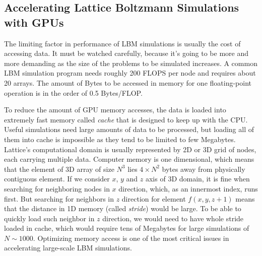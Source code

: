 %
%

\subsection{Accelerating Lattice Boltzmann Simulations with GPUs}

The limiting factor in performance of LBM simulations is usually the cost of accessing data. It must be watched carefully, because it's going to be more and more demanding as the size of the problems to be simulated increases. A common LBM simulation program needs roughly 200 FLOPS per node and requires about 20 arrays. The amount of Bytes to be accessed in memory for one floating-point operation is in the order of 0.5 Bytes/FLOP. 

To reduce the amount of GPU memory accesses, the data is loaded into extremely fast memory called \emph{cache} that is designed to keep up with the CPU. Useful simulations need large amounts of data to be processed, but loading all of them into cache is impossible as they tend to be limited to few Megabytes. Lattice's computational domain is usually represented by 2D or 3D grid of nodes, each carrying multiple data. Computer memory is one dimensional, which means that the element of 3D array of size $N^3$ lies $4 \times N^2$ bytes away from physically contiguous element. If we consider $x$, $y$ and $z$ axis of 3D domain, it is fine when searching for neighboring nodes in $x$ direction, which, as an innermost index, runs first. But searching for neighbors in $z$ direction for element $f(x,y,z+1)$ means that the distance in 1D memory (called \emph{stride}) would be large. To be able to quickly load such neighbor in $z$ direction, we would need to have whole stride loaded in cache, which would require tens of Megabytes for large simulations of $N \sim 1000$. Optimizing memory access is one of the most critical issues in accelerating large-scale LBM simulations.

